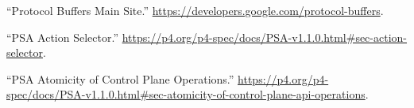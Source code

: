 \documentclass[11pt]{article}
\begin{document}
{{\begin{thebibliography}{45}
\mdbibitemlabel{{}[26]}\textquotedblleft{}Protocol Buffers Main Site.\textquotedblright{} \href{https://developers.google.com/protocol-buffers}{{\ttfamily https://\hspace{0pt}developers.\hspace{0pt}google.\hspace{0pt}com/\hspace{0pt}protocol-\hspace{0pt}buffers}}.\label{proto}%

\mdbibitemlabel{{}[27]}\textquotedblleft{}PSA Action Selector.\textquotedblright{} \href{https://p4.org/p4-spec/docs/PSA-v1.1.0.html\%23sec-action-selector}{{\ttfamily https://\hspace{0pt}p4.\hspace{0pt}org/\hspace{0pt}p4-\hspace{0pt}spec/\hspace{0pt}docs/\hspace{0pt}PSA-\hspace{0pt}v1.\hspace{0pt}1.\hspace{0pt}0.\hspace{0pt}html\#\hspace{0pt}sec-\hspace{0pt}action-\hspace{0pt}selector}}.\label{psaactionselector}%

\mdbibitemlabel{{}[28]}\textquotedblleft{}PSA Atomicity of Control Plane Operations.\textquotedblright{} \href{https://p4.org/p4-spec/docs/PSA-v1.1.0.html\%23sec-atomicity-of-control-plane-api-operations}{{\ttfamily https://\hspace{0pt}p4.\hspace{0pt}org/\hspace{0pt}p4-\hspace{0pt}spec/\hspace{0pt}docs/\hspace{0pt}PSA-\hspace{0pt}v1.\hspace{0pt}1.\hspace{0pt}0.\hspace{0pt}html\#\hspace{0pt}sec-\hspace{0pt}atomicity-\hspace{0pt}of-\hspace{0pt}control-\hspace{0pt}plane-\hspace{0pt}api-\hspace{0pt}operations}}.\label{psaatomicityofcontrolplaneops}%


\end{thebibliography}}}
\end{document}

